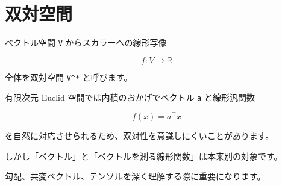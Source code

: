 \documentclass[
  11pt,
  a4paper,
]{ltjsarticle}
\author{}
\date{}
\begin{document}
\hypertarget{ux53ccux5bfeux7a7aux9593}{%
\section{双対空間}\label{ux53ccux5bfeux7a7aux9593}}

ベクトル空間 \texttt{V} からスカラーへの線形写像

\[
f:V\to\mathbb{R}
\]

全体を双対空間 \texttt{V\^{}*} と呼びます。

有限次元 Euclid 空間では内積のおかげでベクトル \texttt{a} と線形汎関数

\[
f(x)=a^\top x
\]

を自然に対応させられるため、双対性を意識しにくいことがあります。

しかし「ベクトル」と「ベクトルを測る線形関数」は本来別の対象です。

勾配、共変ベクトル、テンソルを深く理解する際に重要になります。
\end{document}
